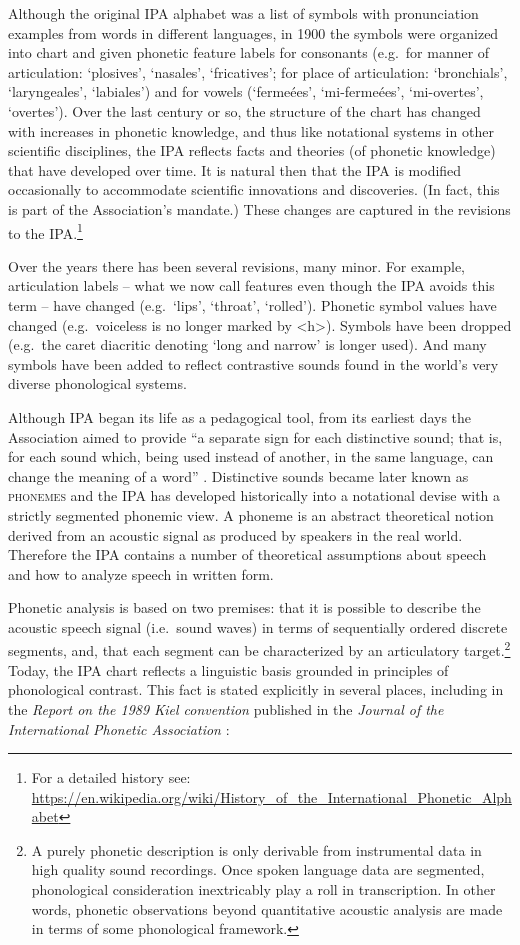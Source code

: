 Although the original IPA alphabet was a list of symbols with pronunciation examples 
from words in different languages, in 1900 the symbols were organized into chart and 
given phonetic feature labels for consonants (e.g.\ for manner of articulation: `plosives', 
`nasales', `fricatives'; for place of articulation: `bronchials', `laryngeales', `labiales') 
and for vowels (`fermeées', `mi-fermeées', `mi-overtes', `overtes'). Over the last century 
or so, the structure of the chart has changed with increases in phonetic knowledge, and 
thus like notational systems in other scientific disciplines, the IPA reflects facts and 
theories (of phonetic knowledge) that have developed over time. It is natural then that 
the IPA is modified occasionally to accommodate scientific innovations and discoveries. 
(In fact, this is part of the Association's mandate.) These changes are captured in 
the revisions to the IPA.\footnote{For a detailed history see: 
\url{https://en.wikipedia.org/wiki/History\_of\_the\_International\_Phonetic_Alphabet}}

Over the years there has been several revisions, many minor. For example, 
articulation labels -- what we now call features even though the IPA avoids this term -- 
have changed (e.g.\ `lips', `throat', `rolled'). Phonetic symbol values have changed 
(e.g.\ voiceless is no longer marked by <h>). Symbols have been dropped (e.g.\ the 
caret diacritic denoting `long and narrow' is longer used). And many symbols have 
been added to reflect contrastive sounds found in the world's very diverse 
phonological systems.

Although IPA began its life as a pedagogical tool, from its earliest days the 
Association aimed to provide ``a separate sign for each distinctive sound; 
that is, for each sound which, being used instead of another, in the same 
language, can change the meaning of a word'' \citep[27]{IPA1999}. Distinctive 
sounds became later known as \textsc{phonemes} and the IPA has developed historically 
into a notational devise with a strictly segmented phonemic view. A phoneme is an 
abstract theoretical notion derived from an acoustic signal as produced by speakers 
in the real world. Therefore the IPA contains a number of theoretical assumptions 
about speech and how to analyze speech in written form. 

Phonetic analysis is based on two premises: that it is possible to describe 
the acoustic speech signal (i.e.\ sound waves) in terms of sequentially ordered 
discrete segments, and, that each segment can be characterized by an articulatory 
target.\footnote{A purely phonetic description is only derivable from instrumental 
data in high quality sound recordings. Once spoken language data are segmented, 
phonological consideration inextricably play a roll in transcription. In other 
words, phonetic observations beyond quantitative acoustic analysis are made in 
terms of some phonological framework.} Today, the IPA chart reflects a linguistic 
basis grounded in principles of phonological contrast. This fact is stated 
explicitly in several places, including in the \textit{Report on the 1989 Kiel 
convention} published in the \textit{Journal of the International Phonetic 
Association} \citep[67-68]{International1989report}:

